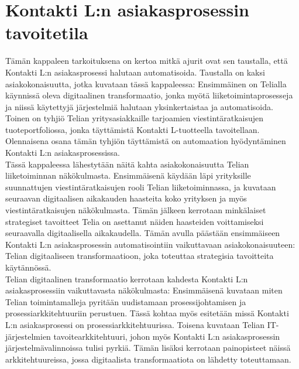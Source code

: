 \documentclass[finnish,12pt,a4paper,pdftex]{article}
\begin{document}
\clearpage

\section{Kontakti L:n asiakasprosessin tavoitetila}

Tämän kappaleen tarkoituksena on kertoa mitkä ajurit ovat sen taustalla, että Kontakti L:n asiakasprosessi halutaan automatisoida. Taustalla on kaksi asiakokonaisuutta, jotka kuvataan tässä kappaleessa: Ensimmäinen on Telialla käynnissä oleva digitaalinen transformaatio, jonka myötä liiketoimintaprosesseja ja niissä käytettyjä järjestelmiä halutaan yksinkertaistaa ja automatisoida. Toinen on tyhjiö Telian yritysasiakkaille tarjoamien viestintäratkaisujen tuoteportfoliossa, jonka täyttämistä Kontakti L-tuotteella tavoitellaan. Olennaisena osana tämän tyhjiön täyttämistä on automaation hyödyntäminen Kontakti L:n asiakasprosessissa.\\

Tässä kappaleessa lähestytään näitä kahta asiakokonaisuutta Telian liiketoiminnan näkökulmasta. Ensimmäisenä käydään läpi yrityksille suunnattujen viestintäratkaisujen rooli Telian liiketoiminnassa, ja kuvataan seuraavan digitaalisen aikakauden haasteita koko yrityksen ja myös viestintäratkaisujen näkökulmasta. Tämän jälkeen kerrotaan minkälaiset strategiset tavoitteet Telia on asettanut näiden haasteiden voittamiseksi seuraavalla digitaalisella aikakaudella. Tämän avulla päästään ensimmäiseen Kontakti L:n asiakasprosessin automatisointiin vaikuttavaan asiakokonaisuuteen: Telian digitaaliseen transformaatioon, joka toteuttaa strategisia tavoitteita käytännössä.\\

Telian digitaalinen transformaatio kerrotaan kahdesta Kontakti L:n asiakasprosessiin vaikuttavasta näkökulmasta: Ensimmäisenä kuvataan miten Telian toimintamalleja pyritään uudistamaan prosessijohtamisen ja prosessiarkkitehtuuriin perustuen. Tässä kohtaa myös esitetään missä Kontakti L:n asiakasprosessi on prosessiarkkitehtuurissa. Toisena kuvataan Telian IT-järjestelmien tavoitearkkitehtuuri, johon myös Kontakti L:n asiakasprosessin järjestelmävalinnoissa tulisi pyrkiä. Tämän lisäksi kerrotaan painopisteet näissä arkkitehtuureissa, jossa digitaalista transformaatiota on lähdetty toteuttamaan.\\
\end{document}
